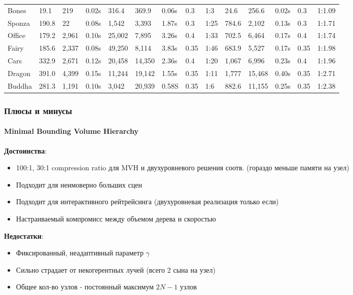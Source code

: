 \begin{frame}[t]
{\begin{tabular}{l||l l l||l l l l l||l l l l l}
            \hline
            Bones & 19.1 & 219 & 0.02s & 316.4 & 369.9 & 0.06s & 0.3 & 1:3 & 24.6 & 256.6 & 0.02s & 0.3 & 1:1.09 \\
            Sponza & 190.8 & 22 & 0.08s & 1,542 & 3,393 & 1.87s & 0.3 & 1:25 & 784.6 & 2,102 & 0.13s & 0.3 & 1:1.71 \\
            Office & 179.2 & 2,961 & 0.10s & 25,002 & 7,895 & 3.26s & 0.4 & 1:33 & 702.5 & 6,464 & 0.17s & 0.4 & 1:1.74 \\
            Fairy & 185.6 & 2,337 & 0.08s & 49,250 & 8,114 & 3.83s & 0.35 & 1:46 & 683.9 & 5,527 & 0.17s & 0.35 & 1:1.98 \\
            Cars & 332.9 & 2,671 & 0.12s & 20,458 & 14,350 & 2.36s & 0.4 & 1:20 & 1,067 & 6,996 & 0.23s & 0.4 & 1:1.96 \\
            Dragon & 391.0 & 4,399 & 0.15s & 11,244 & 19,142 & 1.55s & 0.35 & 1:11 & 1,777 & 15,468 & 0.40s & 0.35 & 1:2.71 \\
            Buddha & 281.3 & 1,191 & 0.10s & 3,042 & 20,939 & 0.58S & 0.35 & 1:6 & 882.6 & 11,155 & 0.25s & 0.35 & 1:2.38 \\
            \hline
    \end{tabular} }
\end{frame}

\begin{frame}[t]
    \frametitle{Плюсы и минусы}
    \framesubtitle{Minimal Bounding Volume Hierarchy}

    \textbf{Достоинства}:
    \begin{itemize}
        \item
            100:1, 30:1 compression ratio для MVH и двухуровневого решения соотв. (гораздо меньше памяти на узел)
        \item
            Подходит для неимоверно больших сцен
        \item
            Подходит для интерактивного рейтрейсинга (двухуровневая реализация только если)
        \item
            Настраиваемый компромисс между объемом дерева и скоростью
    \end{itemize}

    \textbf{Недостатки}:
    \begin{itemize}
        \item
            Фиксированный, неадаптивный параметр $\gamma$
        \item
            Сильно страдает от некогерентных лучей (всего 2 сына на узел)
        \item
            Общее кол-во узлов - постоянный максимум $2N -1$ узлов
    \end{itemize}

\end{frame}

